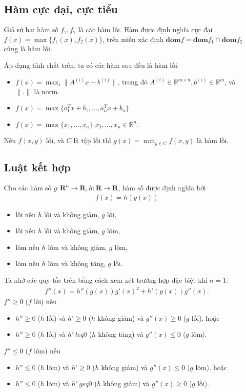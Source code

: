\documentclass{book}
\begin{document}
\subsection*{Hàm cực đại, cực tiểu}
Giả sử hai hàm số $f_1, f_2$ là các hàm lồi. Hàm được định nghĩa cực đại $f(x) = \max\{f_1(x), f_2(x)\}$, trên miền xác định $\mathbf{dom}f = \mathbf{dom}f_1 \cap \mathbf{dom}f_2 $ cũng là hàm lồi.

Áp dụng tính chất trên, ta có các hàm sau đều là hàm lồi:
\begin{itemize}
\item $f(x) = \max_i \|A^{(i)} x - b^{(i)}\|$, trong đó $A^{(i)} \in \mathbb{R}^{m \times n}, b^{(i)} \in \mathbb{R}^m$, và $\|.\|$ là norm.
\item $f(x) = \max\{a_1^T x + b_1, \ldots, a_n^T x + b_n\}$ 
\item $f(x) = \max\{x_1, \ldots, x_n\}$ $x_1, \ldots, x_n \in \mathbb{R}^n$.
\end{itemize}

Nếu $f(x,y)$ lồi, và $C$ là tập lồi thì $g(x) =\min_{y \in C} f(x, y)$ là hàm lồi.

\subsection*{Luật kết hợp}
Cho các hàm số $g: \mathbf{R}^n \rightarrow \mathbf{R}, h: \mathbf{R} \rightarrow \mathbf{R}$, hàm số được định nghĩa bởi
\begin{align*}
f(x) = h(g(x))
\end{align*}
\begin{itemize}
\item lồi nếu $h$ lồi và không giảm, $g$ lồi,
\item lồi nếu $h$ lồi và không giảm, $g$ lõm,
\item lõm nếu $h$ lõm và không giảm, $g$ lõm,
\item lõm nếu $h$ lõm và không tăng, $g$ lồi.
\end{itemize}

Ta nhớ các quy tắc trên bằng cách xem xét trường hợp đặc biệt khi $n=1$:
\begin{align*}
f''(x) = h''(g(x))g'(x)^2 + h'(g(x))g''(x).
\end{align*}
$f'' \geq 0$ ($f$ lồi) nếu 
\begin{itemize}
\item $h'' \geq 0$ ($h$ lồi) và $h' \geq 0$ ($h$ không giảm) và $g''(x) \geq 0$ ($g$ lồi), hoặc 
\item $h'' \geq 0$ ($h$ lồi) và $h' \ leq 0$ ($h$ không tăng) và $g''(x) \leq 0$ ($g$ lõm).
\end{itemize}
$f'' \leq 0$ ($f$ lõm) nếu 
\begin{itemize}
\item $h'' \leq 0$ ($h$ lõm) và $h' \geq 0$ ($h$ không giảm) và $g''(x) \leq 0$ ($g$ lõm), hoặc 
\item $h'' \leq 0$ ($h$ lõm) và $h' \ geq 0$ ($h$ không giảm) và $g''(x) \geq 0$ ($g$ lồi).
\end{itemize}
\end{document}

